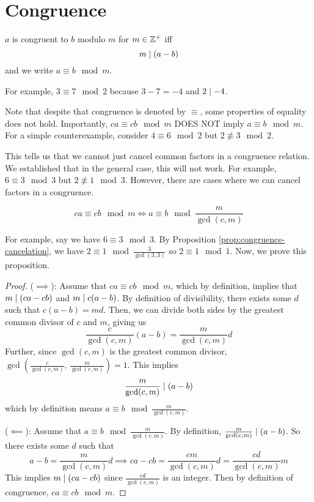 \section{Congruence}

\begin{definition}
    $a$ is congruent to $b$ modulo $m$ for $m \in \mathbb{Z}^+$ iff
    $$
    m \mathrel{\mid} (a-b)
    $$
    and we write $a \equiv b \mod m$.
\end{definition}

For example, $3 \equiv 7 \mod 2$ because $3-7 = -4$ and $2 \mathrel{\mid} -4$.

\begin{remark}
    Note that despite that congruence is denoted by $\equiv$, some properties of equality does not hold. Importantly, $ca \equiv cb \mod m$ DOES NOT imply $a \equiv b \mod m$. For a simple counterexample, consider $4 \equiv 6 \mod 2$ but $2 \not\equiv 3 \mod 2$.
\end{remark}

This tells us that we cannot just cancel common factors in a congruence relation. We established that in the general case, this will not work. For example, $6 \equiv 3 \mod 3$ but $2 \not\equiv 1 \mod 3$. However, there are cases where we can cancel factors in a congruence.

\begin{proposition} \label{prop:congruence-cancelation}
    $$
    ca \equiv cb \mod m \iff a \equiv b \mod \frac{m}{\gcd(c,m)}
    $$
\end{proposition}

For example, say we have $6 \equiv 3 \mod 3$. By Proposition \ref{prop:congruence-cancelation}, we have $2 \equiv 1 \mod \frac{3}{\gcd(3,3)}$ so $2 \equiv 1 \mod 1$. Now, we prove this proposition.

\begin{proof}

    ($\implies$):
    Assume that $ca \equiv cb \mod m$, which by definition, implies that $m \mathrel{\mid} (ca-cb)$ and $m \mathrel{\mid} c(a-b)$. By definition of divisibility, there exists some $d$ such that $c(a-b) = md$. Then, we can divide both sides by the greatest common divisor of $c$ and $m$, giving us
    $$
    \frac{c}{\gcd(c,m)} (a-b) = \frac{m}{\gcd(c,m)} d
    $$
    Further, since $\gcd(c,m)$ is the greatest common divisor, $\gcd\left(\frac{c}{\gcd(c,m)},\, \frac{m}{\gcd(c,m)} \right) = 1$. This implies
    $$
    \frac{m}{\gcd(c,m)} \mathrel{\mid} (a-b)
    $$
    which by definition means $a \equiv b \mod \frac{m}{\gcd(c,m)}$.

    ($\impliedby$): Assume that $a \equiv b \mod \frac{m}{\gcd(c,m)}$. By definition, $\frac{m}{\gcd(c,m)} \mathrel{\mid} (a-b)$. So there exists some $d$ such that
    $$
    a-b = \frac{m}{\gcd(c,m)}d \implies ca - cb = \frac{cm}{\gcd(c,m)} d = \frac{cd}{\gcd(c,m)} m
    $$
    This implies $m \mathrel{\mid} (ca-cb)$ since $\frac{cd}{\gcd(c,m)}$ is an integer. Then by definition of congruence, $ca \equiv cb \mod m$.
\end{proof}

